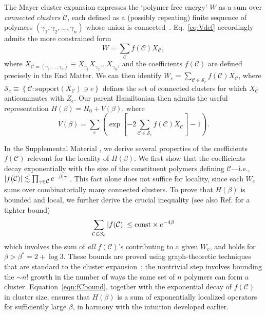 \documentclass[aps,prl,twocolumn,floatfix,nofootinbib]{revtex4-2}
\theoremstyle{definition}
\newcommand{\term}[1]{\left( #1 \right)}
\renewcommand{\comm}[1]{\left[ #1 \right]}
\newcommand{\curly}[1]{\left\{ #1 \right\}}
\newcommand{\CC}{\mathcal{C}}
\begin{document}
The Mayer cluster expansion expresses the `polymer free energy' $W$ as a sum over \emph{connected clusters} $\mathcal{C}$, each defined as a (possibly repeating) finite sequence of polymers $\term{\gamma_{1}, \gamma_{2}, \ldots, \gamma_{n}}$ whose union is connected~\cite{Friedli_Velenik_2017}.  
Eq.~\eqref{eq:Vdef} accordingly admits the more constrained form
\begin{equation}
    W = {\sum_{\mathcal{C}} f(\mathcal{C}) X_{\mathcal{C}}} ,
    \label{eq:V_Mayer}
\end{equation}
where $X_{\mathcal{C} = (\gamma_1,\dots,\gamma_n)} \equiv  X_{\gamma_1}X_{\gamma_2} \dots X_{\gamma_n}$, and the coefficients $f(\mathcal{C})$ are defined precisely in the End Matter.  We can then identify $W_e  = \sum_{\mathcal{C} \in \mathcal{S}_e} f(\CC) X_{\CC}$, where $\mathcal{S}_e \equiv \curly{\CC: \text{support}(X_{\CC}) \ni e}$ defines the set of connected clusters for which $X_\mathcal{C}$ anticommutes with $Z_e$. Our parent Hamiltonian then admits the useful representation $H(\beta) = H_0 + V(\beta)$, where
\begin{equation}
    V(\beta) = \sum_e \term{\exp\comm{-2\sum_{\mathcal{C} \in \mathcal{S}_e} f(\CC) X_{\CC}}-1}.
    \label{eq:HbetafC}
\end{equation}


In the Supplemental Material \cite{SOM}, we derive several properties of the coefficients $f(\mathcal{C})$ relevant for the locality of $H(\beta)$. We first show that the coefficients decay exponentially with the size of the constituent polymers defining $\mathcal{C}$---i.e., $\abs{f(\mathcal{C})} \lesssim \prod_{\gamma \in \mathcal{C}} e^{-\beta \abs{\gamma}}$. This fact alone does not suffice for locality, since each $W_e$ sums over combinatorially many connected clusters. To prove that $H(\beta)$ is bounded and local, we further derive the crucial inequality (see also Ref.  for a tighter bound)
\begin{equation} \label{eqn:fCbound}
    \sum_{\mathcal{C} \in \mathcal{S}_e} \abs{f(\CC)} \leq \mathrm{const} \times e^{-4\beta}
\end{equation}
which involves the sum of \emph{all} $f(\mathcal{C})$'s contributing to a given $W_e$, and holds for $\beta > \beta^* = 2 + \log 3$.  These bounds are proved using graph-theoretic techniques that are standard to the cluster expansion~\cite{Friedli_Velenik_2017,Penrose1967,KoteckyPreiss1986}; the nontrivial step involves bounding the $\sim n!$ growth in the number of ways the same set of $n$ polymers can form a cluster. 
Equation~\eqref{eqn:fCbound}, together with the exponential decay of $f(\CC)$ in cluster size, ensures that  $H(\beta)$ is a sum of exponentially localized operators for sufficiently large $\beta$, in harmony with the intuition developed earlier.
\end{document}

